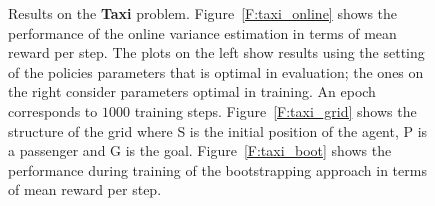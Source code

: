 \begin{figure}[t]
\begin{minipage}{.33\textwidth}
\begin{center}
\end{center}
\end{minipage}
\caption{Results on the \textbf{Taxi} problem. Figure~\ref{F:taxi_online} shows the performance of the online variance estimation in terms of mean reward per step. The plots on the left show results using the setting of the policies parameters that is optimal in evaluation; the ones on the right consider parameters optimal in training. An epoch corresponds to $1000$ training steps. Figure~\ref{F:taxi_grid} shows the structure of the grid where S is the initial position of the agent, P is a passenger and G is the goal. Figure~\ref{F:taxi_boot} shows the performance during training of the bootstrapping approach in terms of mean reward per step.}\label{F:taxi}
\end{figure}
